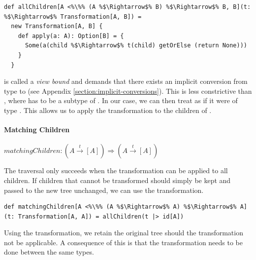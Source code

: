 \begin{lstlisting}
def allChildren[A <%\%% (A %$\Rightarrow$% B) %$\Rightarrow$% B, B](t: %$\Rightarrow$% Transformation[A, B]) = 
  new Transformation[A, B] {
    def apply(a: A): Option[B] = {
      Some(a(child %$\Rightarrow$% t(child) getOrElse (return None)))
    }
  }
\end{lstlisting}

 is called a \textit{view bound} and demands that there exists an implicit conversion from type  to  (see Appendix \vref{section:implicit-conversions}). This is less constrictive than , where  has to be a subtype of . In our case, we can then treat  as if it were of type . This allows us to apply the transformation to the children of .

\paragraph{Matching Children} \hfill $matchingChildren: (A \overset{t}{\rightarrow} [A]) \Rightarrow (A \overset{t}{\rightarrow} [A])$

\vspace{7pt} The  traversal only succeeds when the transformation can be applied to all children. If children that cannot be transformed should simply be kept and passed to the new tree unchanged, we can use the  transformation.

\begin{lstlisting}
def matchingChildren[A <%\%% (A %$\Rightarrow$% A) %$\Rightarrow$% A](t: Transformation[A, A]) = allChildren(t |> id[A])
\end{lstlisting}

Using the  transformation, we retain the original tree should the transformation not be applicable. A consequence of this is that the transformation needs to be done between the same types.



